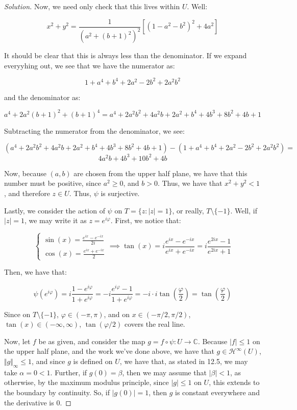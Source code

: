 \documentclass[10pt]{article}
\begin{document}
\begin{proof}[Solution]
Now, we need only check that this lives within $U$. Well:

$$ x^2 + y^2 = \frac{1}{(a^2 + (b+1)^2)^2} [ (1 - a^2 - b^2)^2 + 4a^2] $$

It should be clear that this is always less than the denominator. If we expand everyyhing out, we see that we have the numerator as:

$$ 1 + a^4 + b^4 + 2a^2 - 2b^2 + 2a^2b^2 $$

and the denominator as:

$$ a^4 + 2a^2(b+1)^2 + (b+1)^4 = a^4 + 2a^2b^2 + 4a^2b + 2a^2 + b^4 + 4b^3 + 8b^2 + 4b + 1 $$

Subtracting the numerator from the denominator, we see:

$$ (a^4 + 2a^2b^2 + 4a^2b + 2a^2 + b^4 + 4b^3 + 8b^2 + 4b + 1) -  (1 + a^4 + b^4 + 2a^2 - 2b^2 + 2a^2b^2) = $$
$$ 4a^2b+ 4b^3+ 10 b^2 + 4b $$

Now, because $(a,b)$ are chosen from the upper half plane, we have that this number must be positive, since $a^2 \geq 0$, and $b > 0$. Thus, we have that $x^2 + y^2 < 1$, and therefore $z \in U$. Thus, $\psi$ is surjective.

Lastly, we consider the action of $\psi$ on $T = \{ z : |z| = 1 \}$, or really, $T \setminus \{ -1 \}$. Well, if $|z| = 1$, we may write it as $z = e^{i \varphi}$. First, we notice that:

$$\begin{cases} \sin(x) = \frac{e^{ix} - e^{-ix}}{2i} \\ \cos(x) = \frac{e^{ix} + e^{-ix}}{2} \end{cases} \implies \tan(x) = i \frac{e^{ix} - e^{-ix}}{e^{ix} + e^{-ix}} = i \frac{e^{2ix} - 1}{e^{2ix} + 1}$$

Then, we have that:

$$ \psi(e^{i\varphi}) = i \frac{1 - e^{i\varphi}}{1 + e^{i\varphi}} = -i \frac{ e^{i\varphi} - 1}{1 + e^{i\varphi}} = -i \cdot i \tan\left(\frac{\varphi}{2}\right) =  \tan\left(\frac{\varphi}{2}\right)$$

Since on $T \setminus \{ -1 \}$, $\varphi \in (-\pi, \pi)$, and on $x \in (-\pi/2, \pi/2)$, $\tan(x) \in (-\infty, \infty)$, $\tan(\varphi/2)$ covers the real line.

Now, let $f$ be as given, and consider the map $g = f \circ \psi: U \to \mathbb{C}$. Because $|f| \leq 1$ on the upper half plane, and the work we've done above, we have that $g \in \mathcal{H}^\infty(U)$, $\Vert g \Vert_\infty \leq 1$, and since $g$ is defined on $U$, we have that, as stated in 12.5, we may take $\alpha = 0 < 1$. Further, if $g(0) = \beta$, then we may assume that $| \beta | < 1$, as otherwise, by the maximum modulus principle, since $|g| \leq 1$ on $U$, this extends to the boundary by continuity. So, if $|g(0)| = 1$, then $g$ is constant everywhere and the derivative is 0.


\end{proof}
\end{document}
